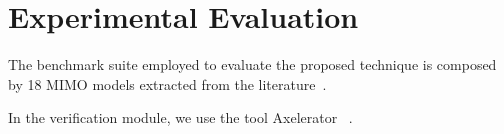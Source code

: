 \documentclass[sigconf]{llncs}
\newcommand{\jrronly}[1]{{}}
\begin{document}
\section{Experimental Evaluation}
\label{exp:evaluation}

\jrronly{
\subsection{Description of the benchmarks}
\label{exp:benchmarks}
}

The benchmark suite employed to evaluate the proposed technique is 
composed by 18 MIMO models extracted from the literature~\cite{acrobot,cstr,CHEN1979389,KOKOTOVIC198023,gajic2008optimal,Franklin15,maglev,converters}.

In the verification module, we use the tool Axelerator~\cite{} .
\end{document}
